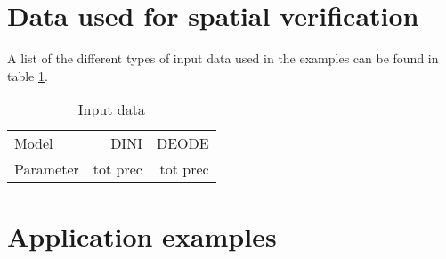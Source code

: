 \documentclass[11pt,a4paper]{article}
\begin{document}
\section{Data used for spatial verification}



A list of the different types of input data used in the examples can be found in table \ref{tab:grib}. %

\begin{table}
{\center\it\caption{ \label{tab:grib} Input data}}
\begin{center}
\begin{tabular}{lrr}
 Model                                       & DINI & DEODE \\
 Parameter    &   tot prec & tot prec \\
\end{tabular}
\end{center}
\end{table} 

\section{Application examples}
%
%
%
\end{document}
